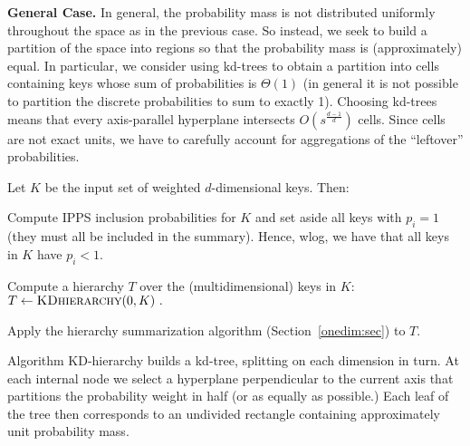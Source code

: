 \documentclass[11pt]{article}
\begin{document}
\medskip
\noindent
{\bf General Case.}
In general, the probability mass is not distributed uniformly
throughout the space as in the previous case. 
So instead, we seek to build a partition of the space into regions so
that the probability mass is (approximately) equal. 
In particular, we consider using 
kd-trees to obtain a partition into cells containing keys whose
sum of probabilities is  $\Theta(1)$ 
(in general it is not possible to partition the discrete probabilities
to sum to exactly 1). 
Choosing kd-trees means that 
every axis-parallel hyperplane intersects $O(s^{\frac{d-1}{d}})$ cells.
Since cells are not exact units, 
we have to carefully account for aggregations of the
 ``leftover'' probabilities.

Let $K$ be the input set of weighted $d$-dimensional keys. 
Then:

\begin{list}{}{\leftmargin=1em}
\item
Compute IPPS inclusion probabilities for $K$ and
set aside all keys with $p_i=1$  
(they must all be included in the summary).  
Hence, wlog, we have that all keys in $K$ have $p_i< 1$.
\item 
Compute a hierarchy $T$ over the (multidimensional) keys in $K$:
$T\leftarrow \mbox{{\sc KDhierarchy}}(0,K)\ .$
\item 
Apply the hierarchy summarization algorithm (Section~\ref{onedim:sec}) to $T$.
\end{list}

Algorithm {\sc KD-hierarchy} builds a kd-tree, splitting on each
dimension in turn. 
 At each internal node we select a hyperplane perpendicular
 to the current axis that partitions the probability weight in half 
(or as equally as possible.) 
 Each leaf of the tree then corresponds to an undivided rectangle
containing approximately unit probability mass. 
\end{document}
